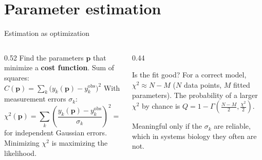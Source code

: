 \documentclass[aspectratio=169,10pt,t]{beamer}
\begin{document}
\section{Parameter estimation}

\begin{frame}{Estimation as optimization}
  \begin{columns}[T]
    \begin{column}{0.52\textwidth}
      Find the parameters $\mathbf{p}$ that minimize a \textbf{cost function}.
      \vskip2mm
      Sum of squares: $\displaystyle C(\mathbf{p}) = \sum_k \big(y_k(\mathbf{p}) - y_k^\text{obs}\big)^2$
      \vskip2mm
      With measurement errors $\sigma_k$:
      \[
        \chi^2(\mathbf{p}) = \sum_k \left(\frac{y_k(\mathbf{p}) - y_k^\text{obs}}{\sigma_k}\right)^2
        = -2\ln P(\text{data}\mid\mathbf{p}) + \text{const}
      \]
      for independent Gaussian errors. Minimizing $\chi^2$ is maximizing the likelihood.
    \end{column}
    \begin{column}{0.44\textwidth}
      \small
      \begin{block}{Is the fit good?}
        For a correct model, $\chi^2 \approx N - M$ ($N$ data points, $M$ fitted
        parameters). The probability of a larger $\chi^2$ by chance is
        $Q = 1 - \Gamma\!\left(\frac{N-M}{2}, \frac{\chi^2}{2}\right)$.
      \end{block}
      Meaningful only if the $\sigma_k$ are reliable, which in systems biology they
      often are not.
    \end{column}
  \end{columns}
\end{frame}
\end{document}
